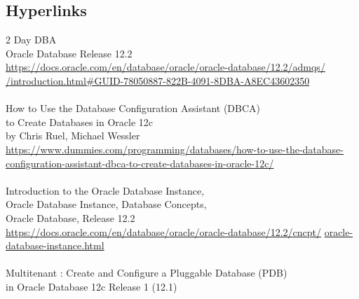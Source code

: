 
\subsection{Hyperlinks}

2 Day DBA\\
Oracle Database Release 12.2\\
\href{https://docs.oracle.com/en/database/oracle/oracle-database/12.2/admqs/introduction.html#GUID-78050887-822B-4091-8DBA-A8EC43602350}{https://docs.oracle.com/en/database/oracle/oracle-database/12.2/admqs/}\\
\href{https://docs.oracle.com/en/database/oracle/oracle-database/12.2/admqs/introduction.html#GUID-78050887-822B-4091-8DBA-A8EC43602350}{/introduction.html\#GUID-78050887-822B-4091-8DBA-A8EC43602350}\\
\\
How to Use the Database Configuration Assistant (DBCA)\\
to Create Databases in Oracle 12c\\
by Chris Ruel, Michael Wessler\\
\href{https://www.dummies.com/programming/databases/how-to-use-the-database-configuration-assistant-dbca-to-create-databases-in-oracle-12c/}{https://www.dummies.com/programming/databases/how-to-use-the-database-configuration-assistant-dbca-to-create-databases-in-oracle-12c/}\\
\\
Introduction to the Oracle Database Instance,\\ 
Oracle Database Instance, Database Concepts,\\
Oracle Database, Release 12.2\\
\href{https://docs.oracle.com/en/database/oracle/oracle-database/12.2/cncpt/oracle-database-instance.html}{https://docs.oracle.com/en/database/oracle/oracle-database/12.2/cncpt/}\newline
\href{http://www.google.com}{oracle-database-instance.html}\\
\\
Multitenant : Create and Configure a Pluggable Database (PDB)\\
in Oracle Database 12c Release 1 (12.1)\\

